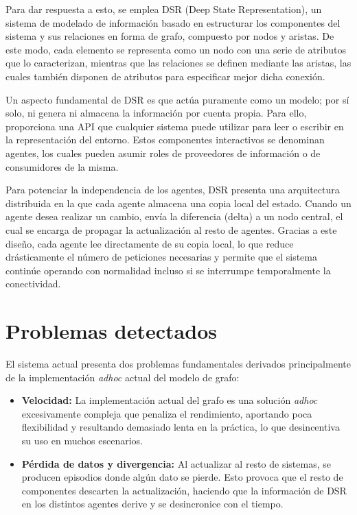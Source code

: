 \documentclass{article}
\begin{document}
Para dar respuesta a esto, se emplea DSR (Deep State Representation), un
sistema de modelado de información basado en estructurar los componentes del
sistema y sus relaciones en forma de grafo, compuesto por nodos y aristas. De
este modo, cada elemento se representa como un nodo con una serie de atributos
que lo caracterizan, mientras que las relaciones se definen mediante las
aristas, las cuales también disponen de atributos para especificar mejor dicha
conexión.

Un aspecto fundamental de DSR es que actúa puramente como un modelo; por sí
solo, ni genera ni almacena la información por cuenta propia. Para ello,
proporciona una API que cualquier sistema puede utilizar para leer o escribir
en la representación del entorno. Estos componentes interactivos se denominan
agentes, los cuales pueden asumir roles de proveedores de información o de
consumidores de la misma.

Para potenciar la independencia de los agentes, DSR presenta una arquitectura
distribuida en la que cada agente almacena una copia local del estado. Cuando
un agente desea realizar un cambio, envía la diferencia (delta) a un nodo
central, el cual se encarga de propagar la actualización al resto de agentes.
Gracias a este diseño, cada agente lee directamente de su copia local, lo que
reduce drásticamente el número de peticiones necesarias y permite que el
sistema continúe operando con normalidad incluso si se interrumpe temporalmente
la conectividad.

\section{Problemas detectados}\label{sec:problems}

El sistema actual presenta dos problemas fundamentales derivados principalmente
de la implementación \textit{adhoc} actual del modelo de grafo:

\begin{itemize}
        \item \textbf{Velocidad:} La implementación actual del grafo es una
              solución \textit{adhoc} excesivamente compleja que penaliza el
              rendimiento, aportando poca flexibilidad y resultando demasiado
              lenta en la práctica, lo que desincentiva su uso en muchos
              escenarios.
        \item \textbf{Pérdida de datos y divergencia:} Al actualizar al resto de
              sistemas, se producen episodios donde algún dato se pierde.
              Esto provoca que el resto de componentes descarten la
              actualización, haciendo que la información de DSR en los distintos
              agentes derive y se desincronice con el tiempo.
\end{itemize}
\end{document}
